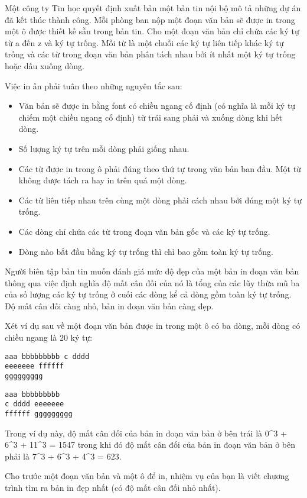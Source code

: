 Một công ty Tin học quyết định xuất bản một bản tin nội bộ mô tả những dự án đã kết thúc thành công. Mỗi phòng ban nộp một đoạn văn bản sẽ được in trong một ô được thiết kế sẵn trong bản tin. Cho một đoạn văn bản chỉ chứa các ký tự từ a đến z và ký tự trống. Mỗi từ là một chuỗi các ký tự liên tiếp khác ký tự trống và các từ trong đoạn văn bản phân tách nhau bởi ít nhất một ký tự trống hoặc dấu xuống dòng.  

   Việc in ấn phải tuân theo những nguyên tắc sau:  
\begin{itemize}
	\item     Văn bản sẽ được in bằng font có chiều ngang cố định (có nghĩa là mỗi ký tự chiếm một chiều ngang cố định) từ trái sang phải và xuống dòng khi hết dòng.   
	\item     Số lượng ký tự trên mỗi dòng phải giống nhau.   
	\item     Các từ được in trong ô phải đúng theo thứ tự trong văn bản ban đầu. Một từ không được tách ra hay in trên quá một dòng.   
	\item     Các từ liên tiếp nhau trên cùng một dòng phải cách nhau bởi đúng một ký tự trống.   
	\item     Các dòng chỉ chứa các từ trong đoạn văn bản gốc và các ký tự trống.   
	\item     Dòng nào bắt đầu bằng ký tự trống thì chỉ bao gồm toàn ký tự trống.   
\end{itemize}

   Người biên tập bản tin muốn đánh giá mức độ đẹp của một bản in đoạn văn bản thông qua việc định nghĩa  độ mất cân đối của nó là tổng của các lũy thừa mũ ba của số lượng các ký tự trống ở cuối các dòng kể cả dòng gồm toàn ký tự trống. Độ mất cân đối càng nhỏ, bản in đoạn văn bản càng đẹp.  

   Xét ví dụ sau về một đoạn văn bản được in trong một ô có ba dòng, mỗi dòng có chiều ngang là 20 ký tự:  
\begin{verbatim}
aaa bbbbbbbbb c dddd
eeeeeee ffffff
ggggggggg		
\end{verbatim}
\begin{verbatim}
aaa bbbbbbbbb      
c dddd eeeeeee       
ffffff ggggggggg
\end{verbatim}

   Trong ví dụ này, độ mất cân đối của bản in đoạn văn bản ở bên trái là 0^3 + 6^3 + 11^3 = 1547 trong khi đó độ mất cân đối của bản in đoạn văn bản ở bên phải là 7^3 + 6^3 + 4^3 = 623.  

   Cho trước một đoạn văn bản và một ô để in, nhiệm vụ của bạn là viết chương trình tìm ra bản in đẹp nhất (có độ mất cân đối nhỏ nhất).